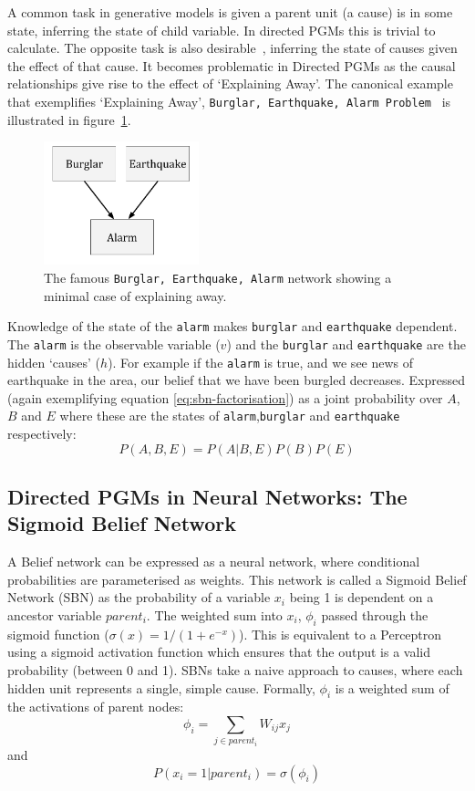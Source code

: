 A common task in generative models is given a parent unit (a cause) is in some state, inferring the state of child variable. In directed PGMs this is trivial to calculate. The opposite task is also desirable~\cite{salakhutdinov2009learning}, inferring the state of causes given the effect of that cause. It becomes problematic in Directed PGMs as the causal relationships give rise to the effect of `Explaining Away'. The canonical example that exemplifies `Explaining Away', \texttt{Burglar, Earthquake, Alarm Problem}~\cite{Barber:2012:BRM:2207809} is illustrated in figure~\ref{F:Explaining-Away}.
\begin{figure}[h]
\begin{center}
  \includegraphics[width = 0.4\textwidth]{Assets/Explaining_Away.png}
\caption{The famous \texttt{Burglar, Earthquake, Alarm} network showing a minimal case of explaining away.}
\label{F:Explaining-Away}
\end{center}
\end{figure}
Knowledge of the state of the \texttt{alarm} makes \texttt{burglar} and \texttt{earthquake} dependent. The \texttt{alarm} is the observable variable ($v$) and the \texttt{burglar} and \texttt{earthquake} are the hidden `causes' ($h$). For example if the \texttt{alarm} is true, and we see news of earthquake in the area, our belief that we have been burgled decreases. Expressed (again exemplifying equation \ref{eq:sbn-factorisation}) as a joint probability over $A$, $B$ and $E$ where these are the states of \texttt{alarm},\texttt{burglar} and \texttt{earthquake} respectively:
$$
P(A,B,E) = P(A|B,E)P(B)P(E)
$$

\subsection{Directed PGMs in Neural Networks: The Sigmoid Belief Network}

A Belief network can be expressed as a neural network, where conditional probabilities are parameterised as weights. This network is called a Sigmoid Belief Network (SBN) as the probability of a variable $x_i$ being 1 is dependent on a ancestor variable $parent_i$. The weighted sum into $x_i$, $\phi_i$ passed through the sigmoid function ($ \sigma(x)=1/(1+e^{-x})$). This is equivalent to a Perceptron using a sigmoid activation function which ensures that the output is a valid probability (between 0 and 1).
SBNs take a naive approach to causes, where each hidden unit represents a single, simple cause. Formally, $\phi_i$ is a weighted sum of the activations of parent nodes:
$$ \phi_i = \sum_{j \in parent_i} W_{ij}x_j$$
and
$$
P(x_i = 1 | parent_i) = \sigma(\phi_i)
$$

